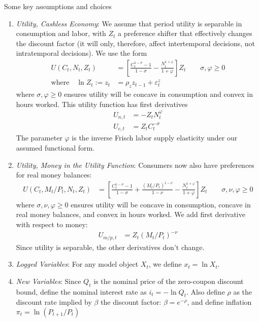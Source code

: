 \documentclass[12pt]{article}
\theoremstyle{plain}
\theoremstyle{definition}
\theoremstyle{remark}
\begin{document}
Some key assumptions and choices
\begin{enumerate}
  \item \emph{Utility, Cashless Economy}:
    We assume that period utility is separable in consumption and labor,
    with $Z_t$ a preference shifter that effectively changes the
    discount factor (it will only, therefore, affect intertemporal
    decisions, not intratemporal decisions). We use the form
    \begin{align*}
      U(C_t,N_t,Z_t) &=
      \left[
        \frac{C_t^{1-\sigma}-1}{1-\sigma}
        -
        \frac{N_t^{1+\varphi}}{1+\varphi}
      \right] Z_t
      \qquad \sigma,\varphi \geq 0 \\
      \text{where}\quad
      \ln Z_t :=
      z_t &= \rho_z z_{t-1} + \varepsilon_t^z
    \end{align*}
    where $\sigma,\varphi\geq 0$ ensures utility will be concave in
    consumption and convex in hours worked.
    This utility function has first derivatives
    \begin{align*}
      U_{n,t} &= -Z_t N_t^{\varphi} \\
      U_{c,t} &= Z_t C_t^{-\sigma}
    \end{align*}
    The parameter $\varphi$ is the inverse Frisch labor supply
    elasticity under our assumed functional form.

  \item \emph{Utility, Money in the Utility Function}:
    Consumers now also have preferences for real money balances:
    \begin{align*}
      U(C_t,M_t/P_t,N_t,Z_t) &=
      \left[
        \frac{C_t^{1-\sigma}-1}{1-\sigma}
        + \frac{(M_t/P_t)^{1-\nu}}{1-\nu}
        - \frac{N_t^{1+\varphi}}{1+\varphi}
      \right] Z_t
      \qquad \sigma,\nu,\varphi \geq 0
    \end{align*}
    where $\sigma,\nu,\varphi\geq 0$ ensures utility will be concave in
    consumption, concave in real money balances, and convex in hours
    worked. We add first derivative with respect to money:
    \begin{align*}
      U_{m/p,t} &= Z_t (M_t/P_t)^{-\nu}
    \end{align*}
    Since utility is separable, the other derivatives don't change.

  \item \emph{Logged Variables}:
    For any model object $X_t$, we define
    $x_t = \ln X_t$.

  \item \emph{New Variables}:
    Since $Q_t$ is the nominal price of the zero-coupon discount bound,
    define the nominal interest rate as $i_t = -\ln Q_t$. Also define
    $\rho$ as the discount rate implied by $\beta$ the discount factor:
    $\beta = e^{-\rho}$, and define inflation $\pi_t=\ln(P_{t+1}/P_t)$


\end{enumerate}
\end{document}
